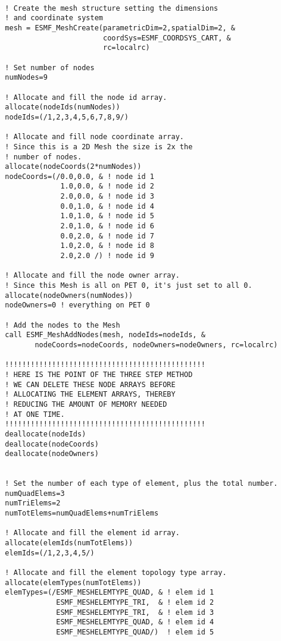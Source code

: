  \begin{verbatim}

  ! Create the mesh structure setting the dimensions
  ! and coordinate system
  mesh = ESMF_MeshCreate(parametricDim=2,spatialDim=2, &
                         coordSys=ESMF_COORDSYS_CART, &
                         rc=localrc)

  ! Set number of nodes
  numNodes=9

  ! Allocate and fill the node id array.
  allocate(nodeIds(numNodes))
  nodeIds=(/1,2,3,4,5,6,7,8,9/) 

  ! Allocate and fill node coordinate array.
  ! Since this is a 2D Mesh the size is 2x the
  ! number of nodes.
  allocate(nodeCoords(2*numNodes))
  nodeCoords=(/0.0,0.0, & ! node id 1
               1.0,0.0, & ! node id 2
               2.0,0.0, & ! node id 3
               0.0,1.0, & ! node id 4
               1.0,1.0, & ! node id 5
               2.0,1.0, & ! node id 6
               0.0,2.0, & ! node id 7
               1.0,2.0, & ! node id 8
               2.0,2.0 /) ! node id 9

  ! Allocate and fill the node owner array.
  ! Since this Mesh is all on PET 0, it's just set to all 0.
  allocate(nodeOwners(numNodes))
  nodeOwners=0 ! everything on PET 0

  ! Add the nodes to the Mesh
  call ESMF_MeshAddNodes(mesh, nodeIds=nodeIds, &
         nodeCoords=nodeCoords, nodeOwners=nodeOwners, rc=localrc)

  !!!!!!!!!!!!!!!!!!!!!!!!!!!!!!!!!!!!!!!!!!!!!!!
  ! HERE IS THE POINT OF THE THREE STEP METHOD
  ! WE CAN DELETE THESE NODE ARRAYS BEFORE 
  ! ALLOCATING THE ELEMENT ARRAYS, THEREBY
  ! REDUCING THE AMOUNT OF MEMORY NEEDED 
  ! AT ONE TIME. 
  !!!!!!!!!!!!!!!!!!!!!!!!!!!!!!!!!!!!!!!!!!!!!!!
  deallocate(nodeIds)
  deallocate(nodeCoords)
  deallocate(nodeOwners)


  ! Set the number of each type of element, plus the total number.
  numQuadElems=3
  numTriElems=2
  numTotElems=numQuadElems+numTriElems

  ! Allocate and fill the element id array.
  allocate(elemIds(numTotElems))
  elemIds=(/1,2,3,4,5/) 

  ! Allocate and fill the element topology type array.
  allocate(elemTypes(numTotElems))
  elemTypes=(/ESMF_MESHELEMTYPE_QUAD, & ! elem id 1
              ESMF_MESHELEMTYPE_TRI,  & ! elem id 2
              ESMF_MESHELEMTYPE_TRI,  & ! elem id 3
              ESMF_MESHELEMTYPE_QUAD, & ! elem id 4
              ESMF_MESHELEMTYPE_QUAD/)  ! elem id 5



\end{verbatim}
